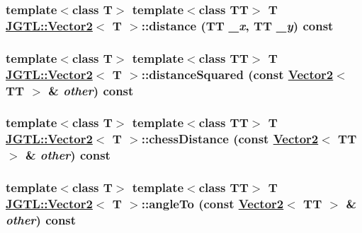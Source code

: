 \hypertarget{class_j_g_t_l_1_1_vector2_0a0c75c934559f4020c190add42ed742}{
\subsubsection[distance]{\setlength{\rightskip}{0pt plus 5cm}template$<$class T$>$ template$<$class TT$>$ T \hyperlink{class_j_g_t_l_1_1_vector2}{JGTL::Vector2}$<$ T $>$::distance (TT {\em \_\-x}, TT {\em \_\-y}) const}}
\label{class_j_g_t_l_1_1_vector2_0a0c75c934559f4020c190add42ed742}


\hypertarget{class_j_g_t_l_1_1_vector2_7f9b3421596d899085eb4b3e26f1f39d}{
\subsubsection[distanceSquared]{\setlength{\rightskip}{0pt plus 5cm}template$<$class T$>$ template$<$class TT$>$ T \hyperlink{class_j_g_t_l_1_1_vector2}{JGTL::Vector2}$<$ T $>$::distance\-Squared (const \hyperlink{class_j_g_t_l_1_1_vector2}{Vector2}$<$ TT $>$ \& {\em other}) const}}
\label{class_j_g_t_l_1_1_vector2_7f9b3421596d899085eb4b3e26f1f39d}


\hypertarget{class_j_g_t_l_1_1_vector2_d931f8977ad736c54b2ecf5c884e3f18}{
\subsubsection[chessDistance]{\setlength{\rightskip}{0pt plus 5cm}template$<$class T$>$ template$<$class TT$>$ T \hyperlink{class_j_g_t_l_1_1_vector2}{JGTL::Vector2}$<$ T $>$::chess\-Distance (const \hyperlink{class_j_g_t_l_1_1_vector2}{Vector2}$<$ TT $>$ \& {\em other}) const}}
\label{class_j_g_t_l_1_1_vector2_d931f8977ad736c54b2ecf5c884e3f18}


\hypertarget{class_j_g_t_l_1_1_vector2_dd5f4c7ce8a21dae2bf2fedb498e3213}{
\subsubsection[angleTo]{\setlength{\rightskip}{0pt plus 5cm}template$<$class T$>$ template$<$class TT$>$ T \hyperlink{class_j_g_t_l_1_1_vector2}{JGTL::Vector2}$<$ T $>$::angle\-To (const \hyperlink{class_j_g_t_l_1_1_vector2}{Vector2}$<$ TT $>$ \& {\em other}) const}}
\label{class_j_g_t_l_1_1_vector2_dd5f4c7ce8a21dae2bf2fedb498e3213}


